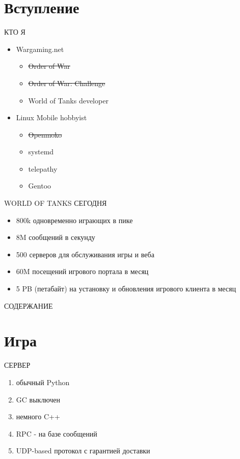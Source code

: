 \documentclass[aspectratio=169]{beamer}
\begin{document}
\section{Вступление}
\begin{frame}{КТО Я}
    \begin{itemize}
        \item Wargaming.net
            \begin{itemize}
                \item \sout{Order of War}
                \item \sout{Order of War: Challenge}
                \item World of Tanks developer
            \end{itemize}
        \item Linux Mobile hobbyist
            \begin{itemize}
                \item \sout{Openmoko}
                \item systemd
                \item telepathy
                \item Gentoo
            \end{itemize}
    \end{itemize}
\end{frame}

\begin{frame}{WORLD OF TANKS СЕГОДНЯ}
    \begin{itemize}
        \item 800k одновременно играющих в пике
        \item 8M сообщений в секунду
        \item 500 серверов для обслуживания игры и веба
        \item 60M посещений игрового портала в месяц
        \item 5 PB (петабайт) на установку и обновления игрового клиента в месяц
    \end{itemize}
\end{frame}

\begin{frame}{СОДЕРЖАНИЕ}
    \tableofcontents
\end{frame}

\section{Игра}
\begin{frame}{СЕРВЕР}
    \begin{enumerate}
        \item обычный Python
        \item GC выключен
        \item немного C++
        \item RPC - на базе сообщений
        \item UDP-based протокол с гарантией доставки
    \end{enumerate}
\end{frame}
\end{document}
